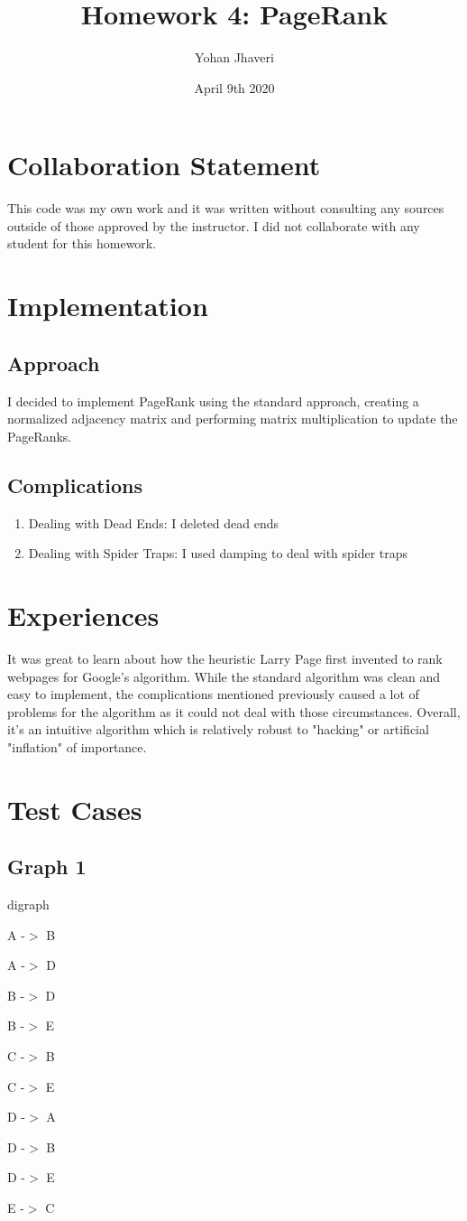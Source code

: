 \documentclass{article}
\title{Homework 4: PageRank}
\author{Yohan Jhaveri}
\date{April 9th 2020}
\begin{document}
\maketitle

\section{Collaboration Statement}
This code was my own work and it was written without consulting any sources outside of those approved by the instructor. I did not collaborate with any student for this homework.

\section{Implementation}
\subsection{Approach}
I decided to implement PageRank using the standard approach, creating a normalized adjacency matrix and performing matrix multiplication to update the PageRanks.

\subsection{Complications}
\begin{enumerate}
    \item Dealing with Dead Ends: I deleted dead ends
    \item Dealing with Spider Traps: I used damping to deal with spider traps
\end{enumerate}

\section{Experiences}
It was great to learn about how the heuristic Larry Page first invented to rank webpages for Google's algorithm. While the standard algorithm was clean and easy to implement, the complications mentioned previously caused a lot of problems for the algorithm as it could not deal with those circumstances. Overall, it's an intuitive algorithm which is relatively robust to "hacking" or artificial "inflation" of importance.

\section{Test Cases}
\subsection{Graph 1}
digraph {

A -$>$ B

A -$>$ D

B -$>$ D

B -$>$ E

C -$>$ B

C -$>$ E

D -$>$ A

D -$>$ B

D -$>$ E

E -$>$ C 

}
\end{document}
